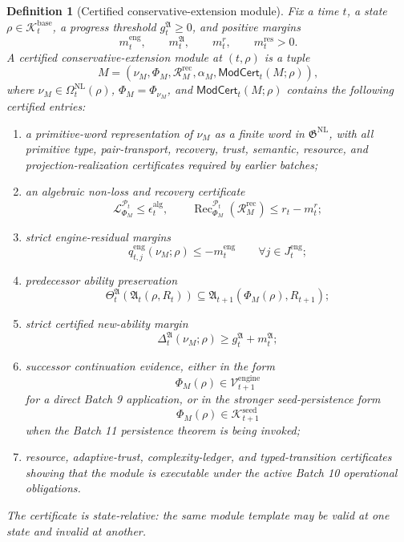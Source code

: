 \documentclass[11pt]{article}
\newtheorem{definition}[theorem]{Definition}
\newcommand{\Pcal}{\mathcal{P}}
\newcommand{\Rcal}{\mathcal{R}}
\newcommand{\Lcal}{\mathcal{L}}
\newcommand{\1}{\mathbf{1}}
\providecommand{\Kcal}{\mathcal{K}}
\providecommand{\Vcal}{\mathcal{V}}
\providecommand{\Rec}{\operatorname{Rec}}
\begin{document}
\begin{definition}[Certified conservative-extension module]
\label{def:batch11_certified_ce_module}
Fix a time \(t\), a state \(\rho\in\Kcal_t^{\mathrm{base}}\), a progress threshold \(g_t^{\mathfrak A}\ge0\), and positive margins
\[
m_t^{\mathrm{eng}},\qquad m_t^{\mathfrak A},\qquad m_t^{r},\qquad m_t^{\mathrm{res}}>0.
\]
A certified conservative-extension module at \((t,\rho)\) is a tuple
\[
M=
(\nu_M,\Phi_M,\Rcal_M^{\mathrm{rec}},\alpha_M,\mathsf{ModCert}_t(M;\rho)),
\]
where \(\nu_M\in\Omega_t^{\mathrm{NL}}(\rho)\), \(\Phi_M=\Phi_{\nu_M}\), and \(\mathsf{ModCert}_t(M;\rho)\) contains the following certified entries:
\begin{enumerate}[label=(\roman*),leftmargin=1.5em]
    \item a primitive-word representation of \(\nu_M\) as a finite word in \(\mathfrak G^{\mathrm{NL}}\), with all primitive type, pair-transport, recovery, trust, semantic, resource, and projection-realization certificates required by earlier batches;
    \item an algebraic non-loss and recovery certificate
    \[
    \Lcal_{\Phi_M}^{\Pcal_t}\le \epsilon_t^{\mathrm{alg}},
    \qquad
    \Rec_{\Phi_M}^{\Pcal_t}(\Rcal_M^{\mathrm{rec}})
    \le r_t-m_t^{r};
    \]
    \item strict engine-residual margins
    \[
    q_{t,j}^{\mathrm{eng}}(\nu_M;\rho)
    \le -m_t^{\mathrm{eng}}
    \qquad\forall j\in J_t^{\mathrm{eng}};
    \]
    \item predecessor ability preservation
    \[
    \Theta_t^{\mathfrak A}(\mathfrak A_t(\rho,R_t))
    \subseteq
    \mathfrak A_{t+1}(\Phi_M(\rho),R_{t+1});
    \]
    \item strict certified new-ability margin
    \[
    \Delta_t^{\mathfrak A}(\nu_M;\rho)
    \ge g_t^{\mathfrak A}+m_t^{\mathfrak A};
    \]
    \item successor continuation evidence, either in the form
    \[
    \Phi_M(\rho)\in\Vcal_{t+1}^{\mathrm{engine}}
    \]
    for a direct Batch 9 application, or in the stronger seed-persistence form
    \[
    \Phi_M(\rho)\in\Kcal_{t+1}^{\mathrm{seed}}
    \]
    when the Batch 11 persistence theorem is being invoked;
    \item resource, adaptive-trust, complexity-ledger, and typed-transition certificates showing that the module is executable under the active Batch 10 operational obligations.
\end{enumerate}
The certificate is state-relative: the same module template may be valid at one state and invalid at another.
\end{definition}
\end{document}
